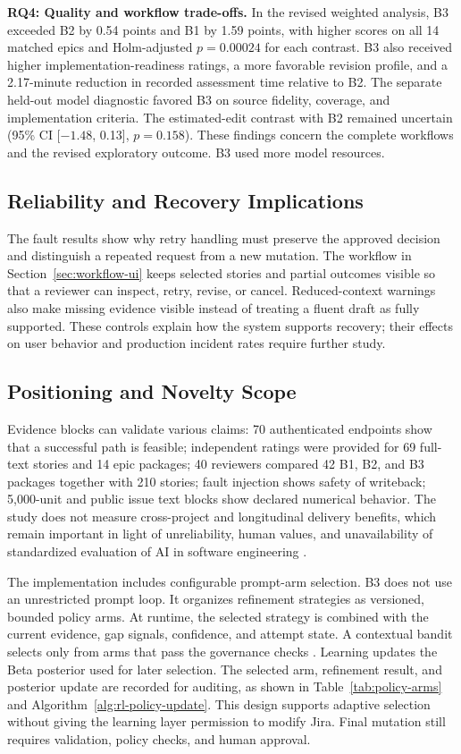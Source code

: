 \documentclass[manuscript,review]{acmart}
\begin{document}
\textbf{RQ4: Quality and workflow trade-offs.} In the revised weighted analysis, B3 exceeded B2 by 0.54 points and B1 by 1.59 points, with higher scores on all 14 matched epics and Holm-adjusted $p=0.00024$ for each contrast. B3 also received higher implementation-readiness ratings, a more favorable revision profile, and a 2.17-minute reduction in recorded assessment time relative to B2. The separate held-out model diagnostic favored B3 on source fidelity, coverage, and implementation criteria. The estimated-edit contrast with B2 remained uncertain (95\% CI [$-1.48$, 0.13], $p=0.158$). These findings concern the complete workflows and the revised exploratory outcome. B3 used more model resources.

\subsection{Reliability and Recovery Implications}
The fault results show why retry handling must preserve the approved decision and distinguish a repeated request from a new mutation. The workflow in Section~\ref{sec:workflow-ui} keeps selected stories and partial outcomes visible so that a reviewer can inspect, retry, revise, or cancel. Reduced-context warnings also make missing evidence visible instead of treating a fluent draft as fully supported. These controls explain how the system supports recovery; their effects on user behavior and production incident rates require further study.

\subsection{Positioning and Novelty Scope}

Evidence blocks can validate various claims: 70 authenticated endpoints show that a successful path is feasible; independent ratings were provided for 69 full-text stories and 14 epic packages; 40 reviewers compared 42 B1, B2, and B3 packages together with 210 stories; fault injection shows safety of writeback; 5{,}000-unit and public issue text blocks show declared numerical behavior. The study does not measure cross-project and longitudinal delivery benefits, which remain important in light of unreliability, human values, and unavailability of standardized evaluation of AI in software engineering \cite{R59,R81,R60}.

The implementation includes configurable prompt-arm selection. B3 does not use an unrestricted prompt loop. It organizes refinement strategies as versioned, bounded policy arms. At runtime, the selected strategy is combined with the current evidence, gap signals, confidence, and attempt state. A contextual bandit selects only from arms that pass the governance checks \cite{R84,R86}. Learning updates the Beta posterior used for later selection. The selected arm, refinement result, and posterior update are recorded for auditing, as shown in Table~\ref{tab:policy-arms} and Algorithm~\ref{alg:rl-policy-update}. This design supports adaptive selection without giving the learning layer permission to modify Jira. Final mutation still requires validation, policy checks, and human approval.
\end{document}
